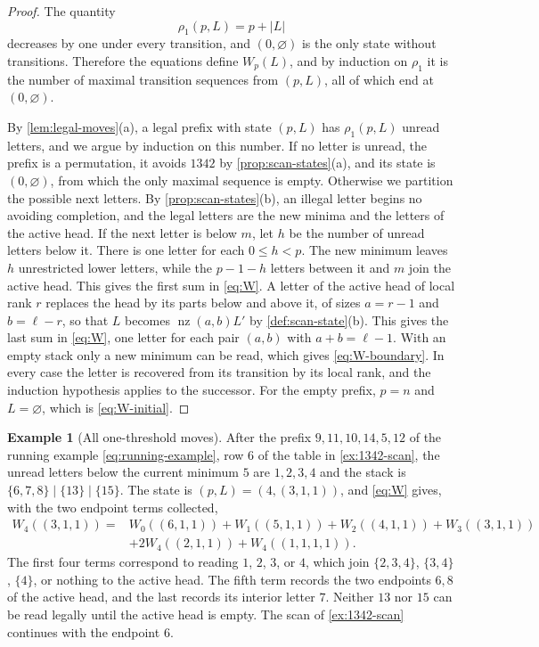 \documentclass[11pt,reqno]{amsart}
\theoremstyle{definition}
\newtheorem{example}[example]{Example}
\theoremstyle{remark}
\newcommand{\nz}{\operatorname{nz}}
\begin{document}
\begin{proof}
The quantity
\begin{equation}\label{eq:rho-scalar}
 \rho_1(p,L)=p+|L|
\end{equation}
decreases by one under every transition, and $(0,\varnothing)$ is the only
state without transitions.  Therefore the equations define $W_p(L)$, and by
induction on $\rho_1$ it is the number of maximal transition sequences from
$(p,L)$, all of which end at $(0,\varnothing)$.

By \cref{lem:legal-moves}(a), a legal prefix with state $(p,L)$ has
$\rho_1(p,L)$ unread letters, and we argue by induction on this number.  If
no letter is unread, the prefix is a permutation, it avoids $1342$ by
\cref{prop:scan-states}(a), and its state is $(0,\varnothing)$, from which the
only maximal sequence is empty.  Otherwise we partition the possible next
letters.  By \cref{prop:scan-states}(b), an illegal letter begins no
avoiding completion, and the legal letters are the new minima and the
letters of the active head.  If the next letter is below $m$, let $h$ be the
number of unread letters below it.  There is one letter for each
$0\leq h<p$.  The new minimum leaves $h$ unrestricted lower letters, while
the $p-1-h$ letters between it and $m$ join the active head.  This gives the
first sum in \eqref{eq:W}.  A letter of the active head of local rank $r$
replaces the head by its parts below and above it, of sizes $a=r-1$ and
$b=\ell-r$, so that $L$ becomes $\nz(a,b)L'$ by \cref{def:scan-state}(b).
This gives the last sum in \eqref{eq:W}, one letter for each pair $(a,b)$
with $a+b=\ell-1$.  With an empty
stack only a new minimum can be read, which gives \eqref{eq:W-boundary}.  In
every case the letter is recovered from its transition by its local rank,
and the induction hypothesis applies to the successor.  For the empty
prefix, $p=n$ and $L=\varnothing$, which is \eqref{eq:W-initial}.
\end{proof}

\begin{example}[All one-threshold moves]\label{ex:1342-state}
After the prefix $9,11,10,14,5,12$ of the running example
\eqref{eq:running-example}, row $6$ of the table in \cref{ex:1342-scan}, the
unread letters below the current minimum $5$ are $1,2,3,4$ and the stack is
$\{6,7,8\}\mid\{13\}\mid\{15\}$.  The state is $(p,L)=(4,(3,1,1))$, and
\eqref{eq:W} gives, with the two endpoint terms collected,
\begin{align*}
 W_4((3,1,1))={}&W_0((6,1,1))+W_1((5,1,1))+W_2((4,1,1))+W_3((3,1,1))\\
 &+2W_4((2,1,1))+W_4((1,1,1,1)).
\end{align*}
The first four terms correspond to reading $1$, $2$, $3$, or $4$, which
join $\{2,3,4\}$, $\{3,4\}$, $\{4\}$, or nothing to the active head.
The fifth term records the two endpoints $6,8$ of the active head, and
the last records its interior letter $7$.  Neither $13$ nor $15$ can be
read legally until the active head is empty.  The scan of
\cref{ex:1342-scan} continues with the endpoint $6$.
\end{example}
\end{document}
